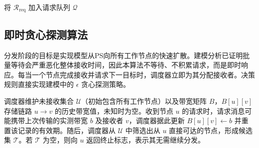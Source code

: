 \documentclass[master, vlined]{DissertUESTC}
\begin{document}
	\begin{algorithm}[!htb]
		\caption{批量最大权匹配算法}
		\label{alg:aggregation_scheduling}
		\BlankLine
		将 $\mathcal{R}_{\text{req}}$ 加入请求队列 $\mathcal{Q}$ \\
		 
	\end{algorithm}

	\subsection{即时贪心探测算法}

	分发阶段的目标是实现模型从PS向所有工作节点的快速扩散。建模分析已证明批量等待会严重恶化整体接收时间，因此本算法不等待、不积累请求，而是即时响应。每当一个节点完成接收并请求下一目标时，调度器立即为其分配接收者。决策规则直接实现建模中的 $\epsilon$ 贪心探测策略。

	调度器维护未接收集合 $\mathcal{U}$（初始包含所有工作节点）以及带宽矩阵 $B$，$B[u][v]$ 存储链路 $u\to v$ 的历史带宽值，未知时为空。收到节点 $u$ 的请求时，请求消息可能携带上次传输的实测带宽 $b$ 及接收者 $v$，调度器据此更新 $B[u][v]\gets b$ 并重置该记录的有效期。随后，调度器从 $\mathcal{U}$ 中筛选出从 $u$ 直接可达的节点，形成候选集 $\mathcal{T}$。若 $\mathcal{T}$ 为空，则向 $u$ 返回终止标志，表示其无需继续分发。
\end{document}
